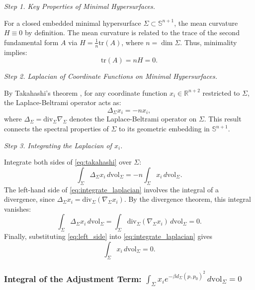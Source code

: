 \documentclass[a4, 12pt]{amsart}
\numberwithin{equation}{section} \numberwithin{equation}{section}
\begin{document}
\textit{Step 1. Key Properties of Minimal Hypersurfaces.}

For a closed embedded minimal hypersurface \( \Sigma \subset \mathbb{S}^{n+1} \), the mean curvature \( H \equiv 0 \) by definition. The mean curvature is related to the trace of the second fundamental form \( A \) via \( H = \frac{1}{n} \text{tr}(A) \), where \( n = \dim \Sigma \). Thus, minimality implies:
\begin{equation}\label{eq:traceA}
\text{tr}(A) = nH = 0.
\end{equation}

\textit{Step 2.  Laplacian of Coordinate Functions on Minimal Hypersurfaces.}

By Takahashi's theorem \cite{Tak}, for any coordinate function \( x_i \in \mathbb{R}^{n+2} \) restricted to \( \Sigma \), the Laplace-Beltrami operator acts as:
\begin{equation}\label{eq:takahashi}
\Delta_{\Sigma} x_i = -n x_i,
\end{equation}
where \( \Delta_{\Sigma} = \text{div}_{\Sigma} \nabla_{\Sigma} \) denotes the Laplace-Beltrami operator on \( \Sigma \). This result connects the spectral properties of \( \Sigma \) to its geometric embedding in \( \mathbb{S}^{n+1} \).


\textit{Step 3.  Integrating the Laplacian of \( x_i \).}

Integrate both sides of \eqref{eq:takahashi} over \( \Sigma \):
\begin{equation}\label{eq:integrate_laplacian}
\int_{\Sigma} \Delta_{\Sigma} x_i \, d\mathrm{vol}_{\Sigma} = -n \int_{\Sigma} x_i \, d\mathrm{vol}_{\Sigma}.
\end{equation}
The left-hand side of \eqref{eq:integrate_laplacian} involves the integral of a divergence, since \( \Delta_{\Sigma} x_i = \text{div}_{\Sigma} (\nabla_{\Sigma} x_i) \). By the divergence theorem, this integral vanishes:
\begin{equation}\label{eq:left_side}
\int_{\Sigma} \Delta_{\Sigma} x_i \, d\mathrm{vol}_{\Sigma} = \int_{\Sigma} \text{div}_{\Sigma} (\nabla_{\Sigma} x_i) \, d\mathrm{vol}_{\Sigma} = 0.
\end{equation}
Finally, substituting \eqref{eq:left_side} into \eqref{eq:integrate_laplacian} gives
\begin{equation}\label{eq:final_result}
\int_{\Sigma} x_i \, d\mathrm{vol}_{\Sigma} = 0.
\end{equation}

\subsubsection{Integral of the Adjustment Term: $\int_{\Sigma} x_i e^{-\beta d_{\Sigma}(p, p_0)^2} \, d\mathrm{vol}_{\Sigma} = 0$}
\end{document}
